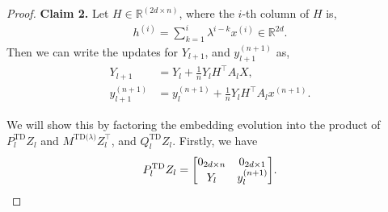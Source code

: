 \documentclass{article}
\newcommand{\R}{\mathbb{R}}
\newcommand{\paren}[1]{{\left(#1\right)}}
\newcommand{\td}{\text{TD}}
\newcommand{\tdlambda}{\text{TD($\lambda$)}}
\begin{document}
\begin{proof}
\textbf{Claim 2.}  Let $H \in \R^{\paren{2d \times n}}$, where the $i$-th column of $H$ is,
    \begin{align}
        h^{(i)} = \sum_{k=1} ^i \lambda^{i-k} x^{(i)} \in \R^{2d}. \label{eq: h^i definition lambda}
    \end{align}
    Then we can write the updates for $Y_{l+1}$, and $y_{l+1}^{(n+1)}$ as,
    \begin{align}
        Y_{l+1} &= Y_l + \frac{1}{n} Y_l H^\top A_l X,\\
        y_{l+1}^{(n+1)} &= y_l^{(n+1)} + \frac{1}{n} Y_l H^\top A_l x^{(n+1)}.
    \end{align}
    
    We will show this by factoring the embedding evolution into the product of $P_l^{\td} Z_l$ and $M^\tdlambda  Z_l^\top$, and  $Q_l^{\td} Z_l$.
    Firstly, we have
    \begin{align}
        P_l^{\td} Z_l = \mqty[0_{2d \times n} & 0_{2d \times 1}\\
                        Y_l & y_l^{(n+1)}].
    \end{align}


\end{proof}
\end{document}
